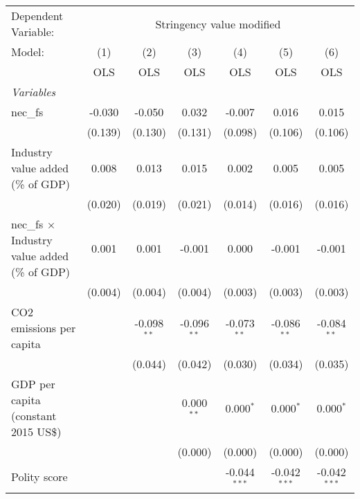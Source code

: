 
\begingroup
\centering
\begin{tabular}{lcccccc}
   \toprule
   Dependent Variable: & \multicolumn{6}{c}{Stringency value modified}\\
   Model:                                               & (1)     & (2)           & (3)           & (4)            & (5)            & (6)\\  
                                                        &  OLS    & OLS           & OLS           & OLS            & OLS            & OLS\\  
   \midrule
   \emph{Variables}\\
   nec\_fs                                              & -0.030  & -0.050        & 0.032         & -0.007         & 0.016          & 0.015\\   
                                                        & (0.139) & (0.130)       & (0.131)       & (0.098)        & (0.106)        & (0.106)\\   
   Industry value added (\% of GDP)                     & 0.008   & 0.013         & 0.015         & 0.002          & 0.005          & 0.005\\   
                                                        & (0.020) & (0.019)       & (0.021)       & (0.014)        & (0.016)        & (0.016)\\   
   nec\_fs $\times$ Industry value added (\% of GDP)    & 0.001   & 0.001         & -0.001        & 0.000          & -0.001         & -0.001\\   
                                                        & (0.004) & (0.004)       & (0.004)       & (0.003)        & (0.003)        & (0.003)\\   
   CO2 emissions per capita                             &         & -0.098$^{**}$ & -0.096$^{**}$ & -0.073$^{**}$  & -0.086$^{**}$  & -0.084$^{**}$\\   
                                                        &         & (0.044)       & (0.042)       & (0.030)        & (0.034)        & (0.035)\\   
   GDP per capita (constant 2015 US\$)                  &         &               & 0.000$^{**}$  & 0.000$^{*}$    & 0.000$^{*}$    & 0.000$^{*}$\\   
                                                        &         &               & (0.000)       & (0.000)        & (0.000)        & (0.000)\\   
   Polity score                                         &         &               &               & -0.044$^{***}$ & -0.042$^{***}$ & -0.042$^{***}$\\   

\end{tabular}

